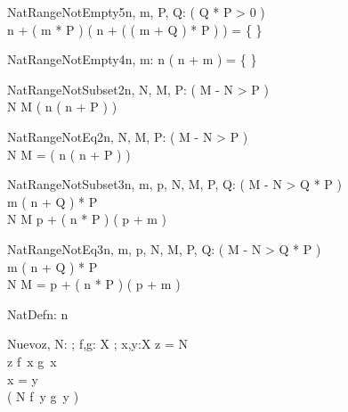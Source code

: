 \begin{theorem}{NatRangeNotEmpty5}{n, m, \const P, \const Q: \nat}
\eval( Q * P > 0 ) \\
n + ( m * P ) \upto ( n + ( ( m + Q ) * P ) ) = \{ \}
\end{theorem}

\begin{theorem}{NatRangeNotEmpty4}{n, m: \nat}
n \upto ( n + m ) = \{ \}
\end{theorem}

\begin{theorem}{NatRangeNotSubset2}{n, \const N, \const M, \const P: \nat}
\eval( M - N > P ) \\
N \upto M \subset ( n \upto ( n + P ) )
\end{theorem}

\begin{theorem}{NatRangeNotEq2}{n, \const N, \const M, \const P: \nat}
\eval( M - N > P ) \\
N \upto M = ( n \upto ( n + P ) )
\end{theorem}

\begin{theorem}{NatRangeNotSubset3}{n, m, p, \const N, \const M, \const P, \const Q: \nat}
\eval( M - N > Q * P ) \\
m \leq ( n + Q ) * P \\
N \upto M \subset p + ( n * P ) \upto ( p + m )
\end{theorem}

\begin{theorem}{NatRangeNotEq3}{n, m, p, \const N, \const M, \const P, \const Q: \nat}
\eval( M - N > Q * P ) \\
m \leq ( n + Q ) * P \\
N \upto M = p + ( n * P ) \upto ( p + m )
\end{theorem}



\begin{theorem}{NatDef}{n: \nat}
 \leq n
\end{theorem}

\begin{theorem}{Nuevo}{z, \const N: \nat; f,g: X \fun \nat; x,\const y:X}
z = N \\
z \notin f~x \upto g~x \\
x = y \\
\eval( N \in f~y \upto g~y )
\end{theorem}


